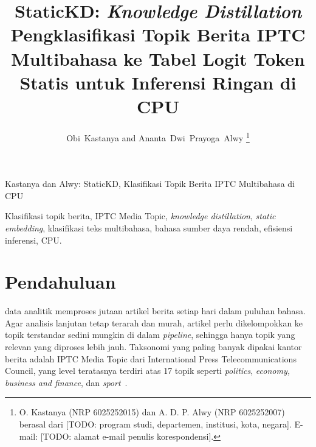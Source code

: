 \documentclass[journal]{IEEEtran}
\DeclareRobustCommand{\todo}[1]{{\color{red}[TODO: #1]}}
\newcommand{\eng}[1]{\textit{#1}}   %
\begin{document}
\title{StaticKD: \eng{Knowledge Distillation} Pengklasifikasi Topik Berita IPTC Multibahasa ke Tabel Logit Token Statis untuk Inferensi Ringan di CPU}

\author{Obi~Kastanya and Ananta~Dwi~Prayoga~Alwy%
\thanks{O. Kastanya (NRP 6025252015) dan A. D. P. Alwy (NRP 6025252007) berasal dari \todo{program studi, departemen, institusi, kota, negara}. E-mail: \todo{alamat e-mail penulis korespondensi}.}}

%
{Kastanya dan Alwy: StaticKD, Klasifikasi Topik Berita IPTC Multibahasa di CPU}

\maketitle

\begin{abstract}

\end{abstract}

\begin{IEEEkeywords}
Klasifikasi topik berita, IPTC Media Topic, \eng{knowledge distillation}, \eng{static embedding}, klasifikasi teks multibahasa, bahasa sumber daya rendah, efisiensi inferensi, CPU.
\end{IEEEkeywords}

\section{Pendahuluan}
 data analitik memproses jutaan artikel berita setiap hari dalam puluhan bahasa. Agar analisis lanjutan tetap terarah dan murah, artikel perlu dikelompokkan ke topik terstandar sedini mungkin di dalam \eng{pipeline}, sehingga hanya topik yang relevan yang diproses lebih jauh. Taksonomi yang paling banyak dipakai kantor berita adalah IPTC Media Topic dari International Press Telecommunications Council, yang level teratasnya terdiri atas 17 topik seperti \eng{politics}, \eng{economy, business and finance}, dan \eng{sport}~\cite{iptc2024mediatopics,kuzman2025llm}.
\end{document}
